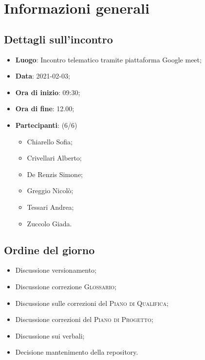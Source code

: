 \section{Informazioni generali}

\subsection{Dettagli sull'incontro}
\begin{itemize}
\item \textbf{Luogo}: Incontro telematico tramite piattaforma Google meet;
\item \textbf{Data}: 2021-02-03;
\item \textbf{Ora di inizio}: 09:30;
\item \textbf{Ora di fine}: 12.00;
\item \textbf{Partecipanti}: (6/6)
\begin{itemize}
	\item Chiarello Sofia;
    \item Crivellari Alberto;
    \item De Renzis Simone;
    \item Greggio Nicolò;
    \item Tessari Andrea;
    \item Zuccolo Giada.
\end{itemize}
\end{itemize}

\subsection{Ordine del giorno}
\begin{itemize}
	\item Discussione versionamento;
	\item Discussione correzione \textsc{Glossario};
	\item Discussione sulle correzioni del \textsc{Piano di Qualifica};
	\item Discussione correzioni del \textsc{Piano di Progetto};
	\item Discussione sui verbali;
	\item Decisione mantenimento della repository.
\end{itemize}


